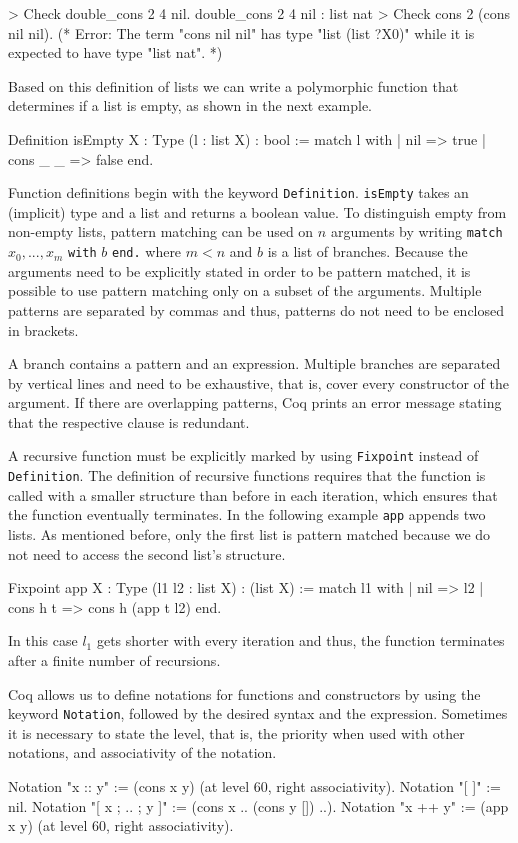 \documentclass[paper = a4, fleqn, abstract=on, twoside]{scrreprt}
\newcommand{\coqinline}[1]{\texttt{#1}}
\begin{document}
\begin{coqcode}
> Check double_cons 2 4 nil.
double_cons 2 4 nil : list nat
> Check cons 2 (cons nil nil). 
(* Error: The term "cons nil nil" has type "list (list ?X0)"
while it is expected to have type "list nat". *)
\end{coqcode}
Based on this definition of lists we can write a polymorphic function that determines if a list is empty, as shown in the next example.
\begin{coqcode}
Definition isEmpty {X : Type} (l : list X) : bool := 
  match l with
  | nil      => true
  | cons _ _ => false
  end.
\end{coqcode}
Function definitions begin with the keyword \coqinline{Definition}. \coqinline{isEmpty} takes an (implicit) type and a list and returns a boolean value. To distinguish empty from non-empty lists, pattern matching can be used on $n$ arguments by writing \coqinline{match} $x_{0},...,x_{m}$ \coqinline{with} $b$ \coqinline{end.} where $m < n$ and $b$ is a list of branches. Because the arguments need to be explicitly stated in order to be pattern matched, it is possible to use pattern matching only on a subset of the arguments. Multiple patterns are separated by commas and thus, patterns do not need to be enclosed in brackets.
\par
A branch contains a pattern and an expression. Multiple branches are separated by vertical lines and need to be exhaustive, that is, cover every constructor of the argument. If there are overlapping patterns, Coq prints an error message stating that the respective clause is redundant.
\par
A recursive function must be explicitly marked by using \coqinline{Fixpoint} instead of \coqinline{Definition}. The definition of recursive functions requires that the function is called with a smaller structure than before in each iteration, which ensures that the function eventually terminates. In the following example \coqinline{app} appends two lists. As mentioned before, only the first list is pattern matched because we do not need to access the second list's structure.
\begin{coqcode}
Fixpoint app {X : Type} (l1 l2 : list X) : (list X) :=
  match l1 with
  | nil => l2
  | cons h t => cons h (app t l2)
  end.
\end{coqcode}
In this case $l_{1}$ gets shorter with every iteration and thus, the function terminates after a finite number of recursions. 

Coq allows us to define notations for functions and constructors by using the keyword \coqinline{Notation}, followed by the desired syntax and the expression. Sometimes it is necessary to state the level, that is, the priority when used with other notations, and associativity of the notation.
\begin{coqcode}
Notation "x :: y" := (cons x y) (at level 60, right associativity).
Notation "[ ]" := nil.
Notation "[ x ; .. ; y ]" := (cons x .. (cons y []) ..).
Notation "x ++ y" := (app x y) (at level 60, right associativity).
\end{coqcode}
\end{document}
